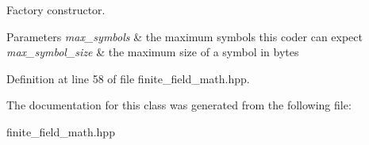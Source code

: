 Factory constructor. 


\begin{DoxyParams}{Parameters}
{\em max\-\_\-symbols} & the maximum symbols this coder can expect \\
\hline
{\em max\-\_\-symbol\-\_\-size} & the maximum size of a symbol in bytes \\
\hline
\end{DoxyParams}


Definition at line 58 of file finite\-\_\-field\-\_\-math.\-hpp.



The documentation for this class was generated from the following file\-:\begin{DoxyCompactItemize}
\item 
finite\-\_\-field\-\_\-math.\-hpp\end{DoxyCompactItemize}
